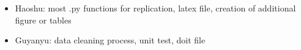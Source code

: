 \documentclass{article}
\begin{document}
\begin{itemize}
    \item Haoshu: most .py functions for replication, latex file, creation of additional figure or tables
    \item Guyanyu: data cleaning process, unit test, doit file
\end{itemize}


















\end{document}
